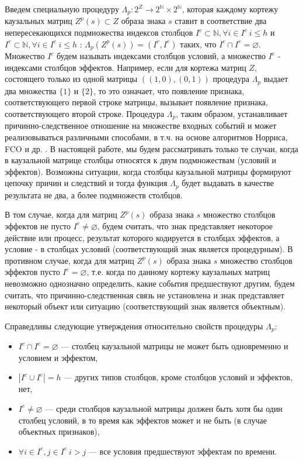 \documentclass[12pt]{scrartcl}
\begin{document}
	Введем специальную процедуру $\Lambda_p: 2^Z\rightarrow 2^{\mathbb N}\times 2^{\mathbb N}$, которая каждому кортежу каузальных матриц $Z^p(s)\subset Z$ образа знака $s$ ставит в соответствие два непересекающихся подмножества индексов столбцов $I^c\subset\mathbb N, \forall i\in I^c\ i\leq h$ и $I^e\subset\mathbb N, \forall i\in I^e\ i\leq h$ : $\Lambda_p(Z^p(s))=(I^c,I^e)$ таких, что $I^c\cap I^e=\varnothing$. Множество $I^c$ будем называть индексами столбцов условий, а множество $I^e$ - индексами столбцов эффектов. Например, если для кортежа матриц $Z$, состоящего только из одной матрицы $((1, 0), (0, 1))$ процедура $\Lambda_p$ выдает два множества $\{1\}$ и $\{2\}$, то это означает, что появление признака, соответствующего первой строке матрицы, вызывает появление признака, соответствующего второй строке. Процедура $\Lambda_p$, таким образом, устанавливает причинно-следственное отношение на множестве входных событий и может реализовываться различными способами, в т.ч. на основе алгоритмов Норриса, FCO и др. \cite{Kuznetsov2001,Kuznetsov1996}. В настоящей работе, мы будем рассматривать только те случаи, когда в каузальной матрице столбцы относятся к двум подмножествам (условий и эффектов). Возможны ситуации, когда столбцы каузальной матрицы формируют цепочку причин и следствий и тогда функция $\Lambda_p$ будет выдавать в качестве результата не два, а более подмножеств столбцов.

	В том случае, когда для матриц $Z^p(s)$ образа знака $s$ множество столбцов эффектов не пусто $I^e \not=\varnothing$, будем считать, что знак представляет некоторое действие или процесс, результат которого кодируется в столбцах эффектов, а условие - в столбцах условий (соответствующий знак является процедурным). В противном случае, когда для матриц $Z^p(s)$ образа знака $s$ множество столбцов эффектов пусто $I^e=\varnothing$, т.е. когда по данному кортежу каузальных матриц невозможно однозначно определить, какие события предшествуют другим, будем считать, что причинно-следственная связь не установлена и знак представляет некоторый объект или ситуацию (соответствующий знак является объектным). 
	
	Справедливы следующие утверждения относительно свойств процедуры $\Lambda_p$:
	\begin{itemize}
		\item $I^c\cap I^e=\varnothing$ --- столбец каузальной матрицы не может быть одновременно и условием и эффектом,
		\item $|I^c\cup I^e|=h$ --- других типов столбцов, кроме столбцов условий и эффектов, нет,
		\item $I^c\not = \varnothing$ --- среди столбцов каузальной матрицы должен быть хотя бы один столбец условий, в то время как эффектов может и не быть (в случае объектных признаков),
		\item $\forall i\in I^e, j\in I^c\ i>j$ --- все условия предшествуют эффектам по времени.
	\end{itemize}
	
\end{document}

